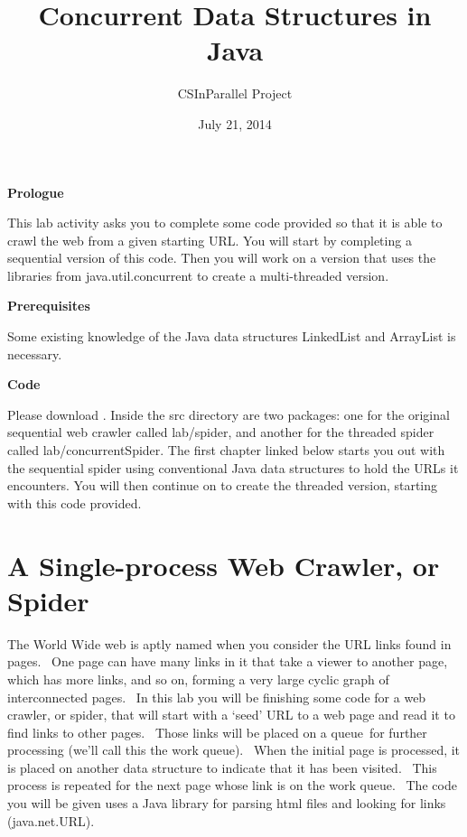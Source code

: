 \documentclass[letterpaper,10pt,openany,oneside]{sphinxmanual}
\title{Concurrent Data Structures in Java}
\date{July 21, 2014}
\author{CSInParallel Project}
\begin{document}
\maketitle
\tableofcontents
{}\label{index::doc}


\textbf{Prologue}

This lab activity asks you to complete some code provided so that it is able to crawl the web from a given starting URL.  You will start by completing a sequential version of this code.  Then you will work on a version that uses the libraries from java.util.concurrent to create a multi-threaded version.

\textbf{Prerequisites}

Some existing knowledge of the Java data structures LinkedList and ArrayList is necessary.

\textbf{Code}

Please download . Inside the src directory are two packages: one for the original sequential web crawler called lab/spider, and another for the threaded spider called lab/concurrentSpider. The first chapter linked below starts you out with the sequential spider using conventional Java data structures to hold the URLs it encounters. You will then continue on to create the threaded version, starting with this code provided.


\chapter{A Single-process Web Crawler, or Spider}
\label{TheSpiderLabonecrawler/TheSpiderLabonecrawler::doc}\label{TheSpiderLabonecrawler/TheSpiderLabonecrawler:concurrent-data-structures-in-java}\label{TheSpiderLabonecrawler/TheSpiderLabonecrawler:a-single-process-web-crawler-or-spider}
The World Wide web is aptly named when you consider the URL links
found in pages.  One page can have many links in it that take a
viewer to another page, which has more links, and so on, forming a
very large cyclic graph of interconnected pages.  In this lab you
will be finishing some code for a web crawler, or spider, that will
start with a ‘seed’ URL to a web page and read it to find links to
other pages.  Those links will be placed on a queue for further
processing (we’ll call this the work queue).  When the initial page
is processed, it is placed on another data structure to indicate
that it has been visited.  This process is repeated for the next
page whose link is on the work queue.  The code you will be given
uses a Java library for parsing html files and looking for links
(java.net.URL).
\end{document}
